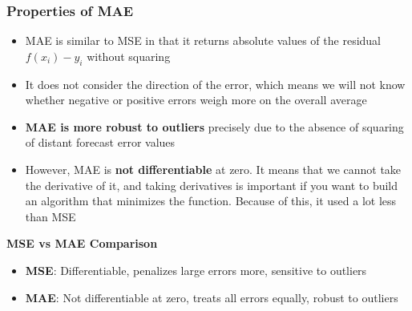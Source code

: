 \documentclass[a4paper]{article}
\theoremstyle{definition}
\begin{document}
\subsubsection{Properties of MAE}
\begin{itemize}
    \item MAE is similar to MSE in that it returns absolute values of the residual \( f(x_i) - y_i \) without squaring 
    \item It does not consider the direction of the error, which means we will not know whether negative or positive errors weigh more on the overall average
    \item \textbf{MAE is more robust to outliers} precisely due to the absence of squaring of distant forecast error values 
    \item However, MAE is \textbf{not differentiable} at zero. It means that we cannot take the derivative of it,
        and taking derivatives is important if you want to build an algorithm that minimizes the function. Because of this, it used a lot less than MSE
\end{itemize}
\begin{center}
    \textbf{MSE vs MAE Comparison}
    \begin{itemize}
        \item \textbf{MSE}: Differentiable, penalizes large errors more, sensitive to outliers 
        \item \textbf{MAE}: Not differentiable at zero, treats all errors equally, robust to outliers
    \end{itemize}
\end{center}
\end{document}
